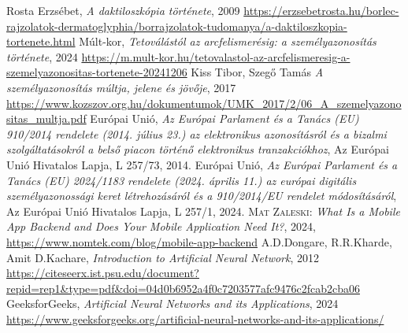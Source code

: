 \documentclass[
]{thesis-ekf}
\theoremstyle{definition}
\theoremstyle{remark}
\begin{document}
\begin{thebibliography}{9}
	 Rosta Erzsébet, \textit{A daktiloszkópia története}, 2009 \url{https://erzsebetrosta.hu/borlec-rajzolatok-dermatoglyphia/borrajzolatok-tudomanya/a-daktiloszkopia-tortenete.html}
	 Múlt-kor, \textit{Tetoválástól az arcfelismerésig: a személyazonosítás története}, 2024 \url{https://m.mult-kor.hu/tetovalastol-az-arcfelismeresig-a-szemelyazonositas-tortenete-20241206}
	 Kiss Tibor, Szegő Tamás \textit{A személyazonosítás múltja, jelene és jövője}, 2017 \url{https://www.kozszov.org.hu/dokumentumok/UMK_2017/2/06_A_szemelyazonositas_multja.pdf}
	 Európai Unió, \textit{Az Európai Parlament és a Tanács (EU) 910/2014 rendelete (2014. július 23.) az elektronikus azonosításról és a bizalmi szolgáltatásokról a belső piacon történő elektronikus tranzakciókhoz}, Az Európai Unió Hivatalos Lapja, L 257/73, 2014.
	 Európai Unió, \textit{Az Európai Parlament és a Tanács (EU) 2024/1183 rendelete (2024. április 11.) az európai digitális személyazonossági keret létrehozásáról és a 910/2014/EU rendelet módosításáról}, Az Európai Unió Hivatalos Lapja, L 257/1, 2024.
	 \textsc{Mat Zaleski:} \textit{What Is a Mobile App Backend and Does Your Mobile Application Need It?}, 2024, \url{https://www.nomtek.com/blog/mobile-app-backend}
	 A.D.Dongare, R.R.Kharde, Amit D.Kachare, \textit{Introduction to Artificial Neural Network}, 2012 \url{https://citeseerx.ist.psu.edu/document?repid=rep1&type=pdf&doi=04d0b6952a4f0c7203577afc9476c2fcab2cba06}
	 GeeksforGeeks, \textit{Artificial Neural Networks and its Applications}, 2024 \url{https://www.geeksforgeeks.org/artificial-neural-networks-and-its-applications/}
\end{thebibliography}
	
\end{document}
